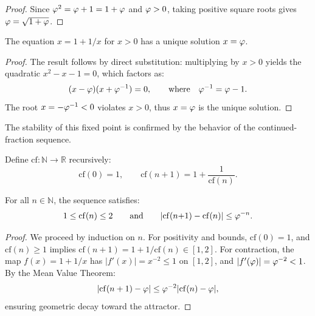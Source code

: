 \begin{proof}
Since $\varphi^2 = \varphi + 1 = 1 + \varphi$ and $\varphi > 0$, taking
positive square roots gives $\varphi = \sqrt{1+\varphi}$.
\end{proof}

\begin{Proposition}\label{prop:golden-unique}
The equation $x=1+1/x$ for $x>0$ has a unique solution $x=\varphi$.
\end{Proposition}

\begin{proof}
The result follows by direct substitution: multiplying by $x>0$ yields the quadratic $x^2 - x - 1 = 0$, which factors as:
\[
  (x - \varphi)(x + \varphi^{-1}) = 0, \qquad\text{where}\quad \varphi^{-1} = \varphi - 1.
\]
The root $x = -\varphi^{-1} < 0$ violates $x>0$, thus $x = \varphi$ is the unique solution.
\end{proof}

The stability of this fixed point is confirmed by the behavior of the continued-fraction sequence.

\begin{Definition}\label{def:cf-seq}
Define $\mathrm{cf}\colon\mathbb{N}\to\mathbb{R}$ recursively:
\begin{equation}\label{eq:cf-def}
  \mathrm{cf}(0)=1, \qquad \mathrm{cf}(n{+}1) = 1 + \frac{1}{\mathrm{cf}(n)}.
\end{equation}
\end{Definition}

\begin{Lemma}\label{lem:cf-bounds}
For all $n \in \mathbb{N}$, the sequence satisfies:
\begin{equation}\label{eq:cf-bounds}
  1 \le \mathrm{cf}(n) \le 2 \qquad\text{and}\qquad
  |\mathrm{cf}(n{+}1)-\mathrm{cf}(n)| \le \varphi^{-n}.
\end{equation}
\end{Lemma}

\begin{proof}
We proceed by induction on $n$. For positivity and bounds, $\mathrm{cf}(0)=1$, and $\mathrm{cf}(n)\ge 1$ implies $\mathrm{cf}(n+1)=1+1/\mathrm{cf}(n)\in [1,2]$. For contraction, the map $f(x)=1+1/x$ has $|f'(x)|=x^{-2}\le 1$ on $[1,2]$, and $|f'(\varphi)| = \varphi^{-2} < 1$. By the Mean Value Theorem:
\[
  |\mathrm{cf}(n+1)-\varphi| \le \varphi^{-2}|\mathrm{cf}(n)-\varphi|,
\]
ensuring geometric decay toward the attractor.
\end{proof}

